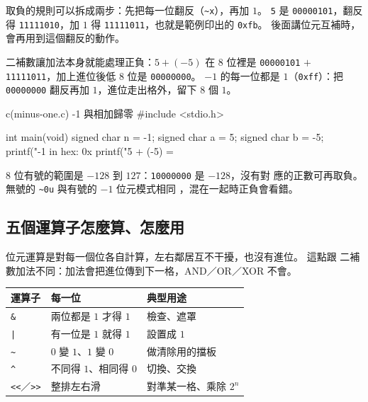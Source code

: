 取負的規則可以拆成兩步：先把每一位翻反（\texttt{\~{}x}），再加 $1$。
\texttt{5} 是 \texttt{00000101}，翻反得 \texttt{11111010}，加 $1$ 得
\texttt{11111011}，也就是範例印出的 \texttt{0xfb}。 後面講位元互補時，
會再用到這個翻反的動作。

二補數讓加法本身就能處理正負：$5 + (-5)$ 在 8 位裡是
\texttt{00000101} $+$ \texttt{11111011}，加上進位後低 8 位是
\texttt{00000000}。 $-1$ 的每一位都是 $1$（\texttt{0xff}）：把
\texttt{00000000} 翻反再加 $1$，進位走出格外，留下 8 個 $1$。

\begin{example}{c}{(minus-one.c) -1 與相加歸零}
#include <stdio.h>

int main(void) {
    signed char n = -1;
    signed char a = 5;
    signed char b = -5;
    printf("-1 in hex: 0x%
    printf("5 + (-5) = %
}
\end{example}


8 位有號的範圍是 $-128$ 到 $127$：\texttt{10000000} 是 $-128$，沒有對
應的正數可再取負。 無號的 \texttt{\~{}0u} 與有號的 $-1$ 位元模式相同
，混在一起時正負會看錯。



\subsection{五個運算子怎麼算、怎麼用}

位元運算是對每一個位各自計算，左右鄰居互不干擾，也沒有進位。 這點跟
二補數加法不同：加法會把進位傳到下一格，AND／OR／XOR 不會。

\begin{center}
\begin{tabular}{|l|l|l|}
\hline
\textbf{運算子} & \textbf{每一位} & \textbf{典型用途} \\
\hline
\texttt{\&} & 兩位都是 $1$ 才得 $1$ & 檢查、遮罩 \\
\texttt{|} & 有一位是 $1$ 就得 $1$ & 設置成 $1$ \\
\texttt{\~{}} & $0$ 變 $1$、$1$ 變 $0$ & 做清除用的擋板 \\
\texttt{\textasciicircum{}} & 不同得 $1$、相同得 $0$ & 切換、交換 \\
\texttt{<<}／\texttt{>>} & 整排左右滑 & 對準某一格、乘除 $2^n$ \\
\hline
\end{tabular}
\end{center}

